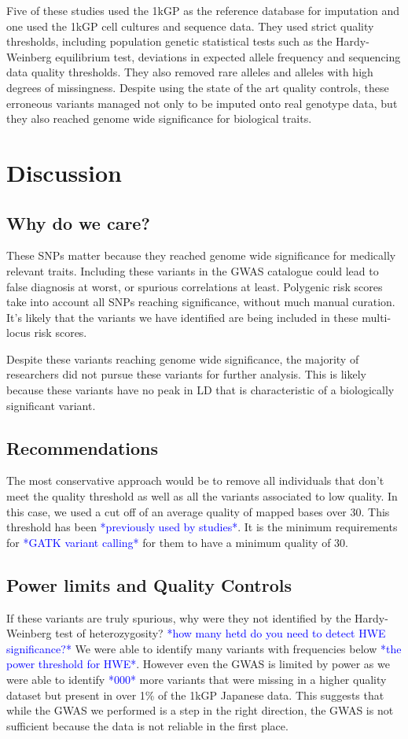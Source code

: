 \documentclass[9pt,lineno]{elife}
\newcommand{\todo}[1]{\textcolor{blue}{*#1*}}
\begin{document}
Five of these studies used the 1kGP as the reference database for imputation and one used the 1kGP cell cultures and sequence data. 
They used strict quality thresholds, including population genetic statistical tests such as the Hardy-Weinberg equilibrium test, deviations in expected allele frequency and sequencing data quality thresholds. 
They also removed rare alleles and alleles with high degrees of missingness. 
Despite using the state of the art quality controls, these erroneous variants managed not only to be imputed onto real genotype data, but they also reached genome wide significance for biological traits. 

			\section{Discussion}
\subsection{Why do we care?}
These SNPs matter because they reached genome wide significance for medically relevant traits. 
Including these variants in the GWAS catalogue could lead to false diagnosis at worst, or spurious correlations at least. 
Polygenic risk scores take into account all SNPs reaching significance, without much manual curation. 
It's likely that the variants we have identified are being included in these multi-locus risk scores.

Despite these variants reaching genome wide significance, the majority of researchers did not pursue these variants for further analysis.
This is likely because these variants have no peak in LD that is characteristic of a biologically significant variant.

\subsection{Recommendations}
The most conservative approach would be to remove all individuals that don't meet the quality threshold as well as all the variants associated to low quality.
In this case, we used a cut off of an average quality of mapped bases over 30. This threshold has been \todo{previously used by studies}. It is the minimum requirements for \todo{GATK variant calling} for them to have a minimum quality of 30.

\subsection{Power limits and Quality Controls}
If these variants are truly spurious, why were they not identified by the Hardy-Weinberg test of heterozygosity?
\todo{how many hetd do you need to detect HWE significance?}
We were able to identify many variants with frequencies below \todo{the power threshold for HWE}.
However even the GWAS is limited by power as we were able to identify \todo{000} more variants that were missing in a higher quality dataset but present in over 1\% of the 1kGP Japanese data. 
This suggests that while the GWAS we performed is a step in the right direction, the GWAS is not sufficient because the data is not reliable in the first place. 
\end{document}
